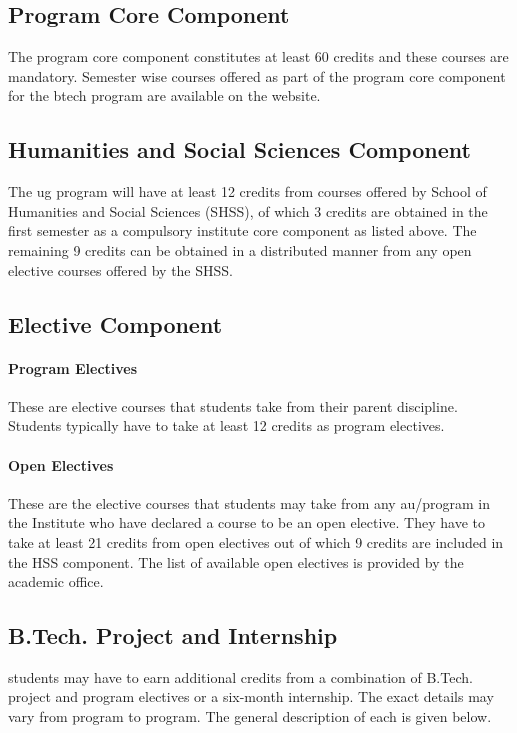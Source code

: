 \subsection{Program Core Component}

The program core component constitutes at least 60 credits and these courses are mandatory. Semester wise courses offered as part of the program core component for the \acrshort{btech} program are available on the website.

\subsection{Humanities and Social Sciences Component}

The \acrshort{ug} program will have at least 12 credits from courses offered by School of Humanities and Social Sciences (SHSS), of which 3 credits are obtained in the first semester as a compulsory institute core component as listed above. The remaining 9 credits can be obtained in a distributed manner from any open elective courses offered by the SHSS. 

\subsection{Elective Component}

\paragraph{Program Electives} These are elective courses that students take from their parent discipline. Students typically have to take at least 12 credits as program electives.

\paragraph{Open Electives} These are the elective courses that students may take from any \acrshort{au}/\gls{program} in the Institute who have declared a course to be an open elective. They have to take at least 21 credits from open electives out of which 9 credits are included in the HSS component. The list of available open electives is provided by the academic office.

\subsection{B.Tech. Project and Internship}

\glspl{student} may have to earn additional credits from a combination of B.Tech. project and program electives or a six-month internship. The exact details may vary from program to program. The general description of each is given below.

